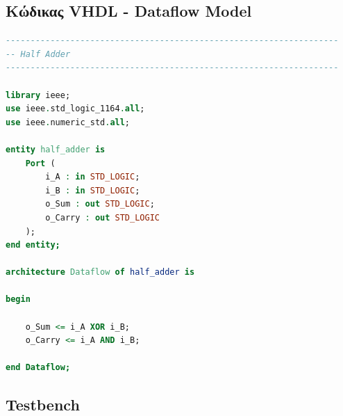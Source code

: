 \documentclass[12pt]{article}
\begin{document}
\subsection*{Κώδικας VHDL - Dataflow Model}

\begin{lstlisting}[language=VHDL]
-------------------------------------------------------------------
-- Half Adder
-------------------------------------------------------------------

library ieee;
use ieee.std_logic_1164.all;
use ieee.numeric_std.all;

entity half_adder is
    Port (
        i_A : in STD_LOGIC;
        i_B : in STD_LOGIC;
        o_Sum : out STD_LOGIC;
        o_Carry : out STD_LOGIC
    );
end entity;

architecture Dataflow of half_adder is

begin

    o_Sum <= i_A XOR i_B;
    o_Carry <= i_A AND i_B;

end Dataflow;
\end{lstlisting}

\subsection*{Testbench}
\end{document}
